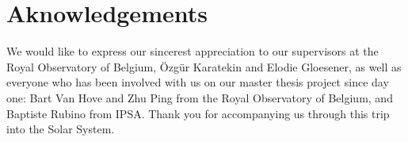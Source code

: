 \section*{Aknowledgements}
\label{aknowlegdements}

We would like to express our sincerest appreciation to our supervisors at the Royal Observatory of Belgium, Özgür Karatekin and Elodie Gloesener, as well as everyone who has been involved with us on our master thesis project since day one: Bart Van Hove and Zhu Ping from the Royal Observatory of Belgium, and Baptiste Rubino from IPSA. Thank you for accompanying us through this trip into the Solar System. 
